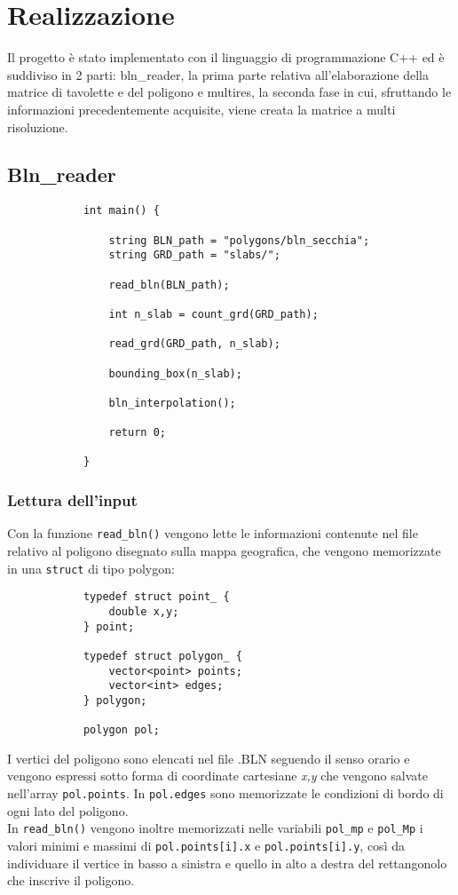 \chapter{Realizzazione}
	Il progetto \`{e} stato implementato con il linguaggio di programmazione C++ ed \`{e} suddiviso in 2 parti: bln\_reader, la prima parte relativa all'elaborazione della matrice di tavolette e del poligono e multires, la seconda fase in cui, sfruttando le informazioni precedentemente acquisite, viene creata la matrice a multi risoluzione.

	\section{Bln\_reader}
		\begin{verbatim}
			int main() {

			    string BLN_path = "polygons/bln_secchia";
			    string GRD_path = "slabs/";

			    read_bln(BLN_path);

			    int n_slab = count_grd(GRD_path);

			    read_grd(GRD_path, n_slab);
				
			    bounding_box(n_slab);

			    bln_interpolation();

			    return 0;

			}
		\end{verbatim}
		\subsection{Lettura dell'input}
			Con la funzione \texttt{read\_bln()} vengono lette le informazioni contenute nel file relativo al poligono disegnato sulla mappa geografica, che vengono memorizzate in una \texttt{struct} di tipo polygon:  
		\begin{verbatim}
			typedef struct point_ {
			    double x,y;
			} point;

			typedef struct polygon_ {
			    vector<point> points; 
			    vector<int> edges;    
			} polygon;

			polygon pol;
		\end{verbatim} 
		I vertici del poligono sono elencati nel file .BLN seguendo il senso orario e vengono espressi sotto forma di coordinate cartesiane \textit{x,y} che vengono salvate nell'array \texttt{pol.points}. In \texttt{pol.edges} sono memorizzate le condizioni di bordo di ogni lato del poligono. \\
		In \texttt{read\_bln()} vengono inoltre memorizzati nelle variabili \texttt{pol\_mp} e \texttt{pol\_Mp} i valori minimi e massimi di \texttt{pol.points[i].x} e \texttt{pol.points[i].y}, cos\`{i} da individuare il vertice in basso a sinistra e quello in alto a destra del rettangonolo che inscrive il poligono.


